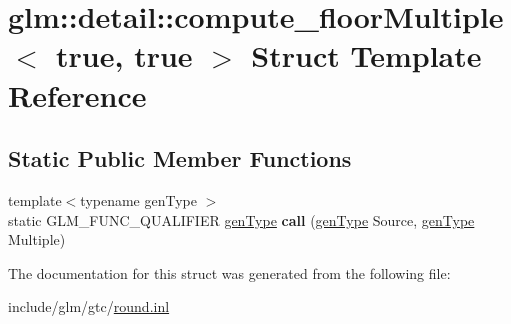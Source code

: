 \hypertarget{structglm_1_1detail_1_1compute__floorMultiple_3_01true_00_01true_01_4}{}\section{glm\+:\+:detail\+:\+:compute\+\_\+floor\+Multiple$<$ true, true $>$ Struct Template Reference}
\label{structglm_1_1detail_1_1compute__floorMultiple_3_01true_00_01true_01_4}
\subsection*{Static Public Member Functions}
\begin{DoxyCompactItemize}
\item 
\mbox{\label{structglm_1_1detail_1_1compute__floorMultiple_3_01true_00_01true_01_4_a18fef0ea82a4549501b832f4571ab1c5}} 
{\footnotesize template$<$typename gen\+Type $>$ }\\static G\+L\+M\+\_\+\+F\+U\+N\+C\+\_\+\+Q\+U\+A\+L\+I\+F\+I\+ER \hyperlink{structglm_1_1detail_1_1genType}{gen\+Type} {\bfseries call} (\hyperlink{structglm_1_1detail_1_1genType}{gen\+Type} Source, \hyperlink{structglm_1_1detail_1_1genType}{gen\+Type} Multiple)
\end{DoxyCompactItemize}


The documentation for this struct was generated from the following file\+:\begin{DoxyCompactItemize}
\item 
include/glm/gtc/\hyperlink{round_8inl}{round.\+inl}\end{DoxyCompactItemize}
